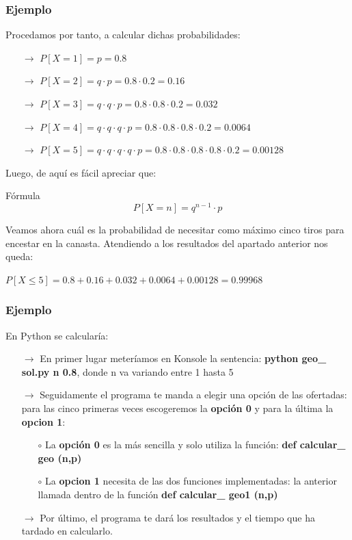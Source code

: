 \documentclass{beamer}
\begin{document}
\begin{frame}
\frametitle{Ejemplo}
Procedamos por tanto, a calcular dichas probabilidades:
\begin{itemize}
\item [$\rightarrow$]{$P[X=1]=  p= 0.8 $} \pause
\item [$\rightarrow$]{$P[X=2]= q\cdot p= 0.8\cdot 0.2 = 0.16$} \pause
\item [$\rightarrow$]{$P[X=3]= q\cdot q\cdot p= 0.8\cdot 0.8\cdot 0.2 = 0.032$} \pause
\item [$\rightarrow$]{$P[X=4]= q\cdot q\cdot q\cdot p= 0.8\cdot 0.8\cdot 0.8\cdot 0.2 = 0.0064$} \pause
\item [$\rightarrow$]{$P[X=5]= q\cdot q\cdot q\cdot q\cdot p= 0.8\cdot 0.8\cdot 0.8\cdot 0.8\cdot 0.2 = 0.00128$}
\end{itemize}
Luego, de aquí es fácil apreciar que:
\begin{block}{Fórmula}
{\[P[X=n]= q^{n-1}\cdot p\]}
\end{block} \pause
Veamos ahora cuál es la probabilidad de necesitar como máximo cinco tiros para encestar en la canasta. Atendiendo a los resultados del apartado anterior nos queda:
\begin{center}
{$P[X\leq5]=0.8 + 0.16 + 0.032 + 0.0064 +0.00128 = 0.99968$}
\end{center}
\end{frame}
\begin{frame}
\frametitle{Ejemplo}
En Python se calcularía:
\begin{itemize}
  \item[$\rightarrow$]En primer lugar meteríamos en Konsole la sentencia: \textbf{python geo\_ sol.py n 0.8}, donde n va variando entre 1 hasta 5
  \item[$\rightarrow$]Seguidamente el programa te manda a elegir una opción de las ofertadas: para las cinco primeras veces escogeremos la \textbf{opción 0} y para la última la \textbf{opcion 1}:
  \begin{itemize}
  	\item[$\circ$]La \textbf{opción 0} es la más sencilla y solo utiliza la función: \textbf{def calcular\_ geo (n,p)}
  	\item[$\circ$]La \textbf{opcion 1} necesita de las dos funciones implementadas: la anterior llamada dentro de la función \textbf{def calcular\_ geo1 (n,p)}
  \end{itemize}
  \item[$\rightarrow$]Por último, el programa te dará los resultados y el tiempo que ha tardado en calcularlo.
\end{itemize}
\end{frame}
\end{document}
